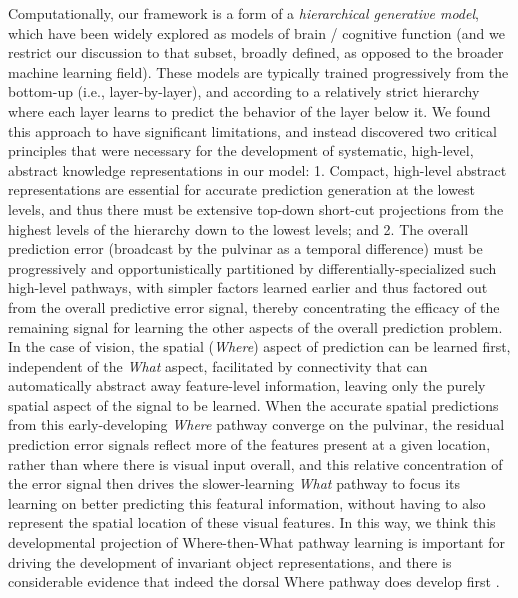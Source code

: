 \documentclass[11pt,twoside]{article}
\newif\myifpdf
\begin{document}
Computationally, our framework is a form of a {\em hierarchical generative model}, which have been widely explored as models of brain / cognitive function (and we restrict our discussion to that subset, broadly defined, as opposed to the broader machine learning field).  These models are typically trained progressively from the bottom-up (i.e., layer-by-layer), and according to a relatively strict hierarchy where each layer learns to predict the behavior of the layer below it.  We found this approach to have significant limitations, and instead discovered two critical principles that were necessary for the development of systematic, high-level, abstract knowledge representations in our model: 1. Compact, high-level abstract representations are essential for accurate prediction generation at the lowest levels, and thus there must be extensive top-down short-cut projections from the highest levels of the hierarchy down to the lowest levels; and 2. The overall prediction error (broadcast by the pulvinar as a temporal difference) must be progressively and opportunistically partitioned by differentially-specialized such high-level pathways, with simpler factors learned earlier and thus factored out from the overall predictive error signal, thereby concentrating the efficacy of the remaining signal for learning the other aspects of the overall prediction problem.  In the case of vision, the spatial ({\em Where}) aspect of prediction can be learned first, independent of the {\em What} aspect, facilitated by connectivity that can automatically abstract away feature-level information, leaving only the purely spatial aspect of the signal to be learned.  When the accurate spatial predictions from this early-developing {\em Where} pathway converge on the pulvinar, the residual prediction error signals reflect more of the features present at a given location, rather than where there is visual input overall, and this relative concentration of the error signal then drives the slower-learning {\em What} pathway to focus its learning on better predicting this featural information, without having to also represent the spatial location of these visual features.  In this way, we think this developmental projection of Where-then-What pathway learning is important for driving the development of invariant object representations, and there is considerable evidence that indeed the dorsal Where pathway does develop first \cite{BridgeLeopoldBourne16}.
\end{document}
